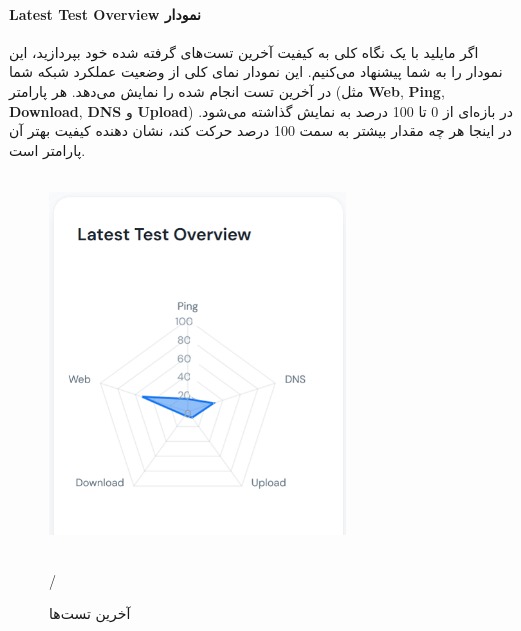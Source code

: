 \documentclass{report}
\begin{document}
\paragraph{Latest Test Overview نمودار}
اگر مایلید با یک نگاه کلی به کیفیت آخرین تست‌های گرفته شده خود بپردازید، این نمودار را به شما پیشنهاد می‌کنیم. این نمودار نمای کلی از وضعیت عملکرد شبکه شما در آخرین تست انجام شده را نمایش می‌دهد. هر پارامتر (مثل \textbf{Web}, \textbf{Ping}, \textbf{Download}, \textbf{DNS} و \textbf{Upload}) در بازه‌ای از 0 تا 100 درصد به نمایش گذاشته می‌شود. در اینجا هر چه مقدار بیشتر به سمت 100 درصد حرکت کند، نشان دهنده کیفیت بهتر آن پارامتر است.
 \begin{figure}[ht]
	\centering
	\includegraphics[width=0.7\textwidth,height=10cm,keepaspectratio]{Pic/latest}
	\caption{آخرین تست‌ها}/
	\label{fig:latest}
\end{figure}
\end{document}
